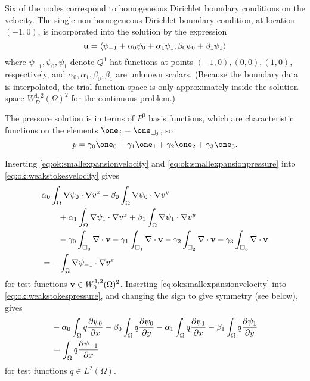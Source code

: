 Six of the nodes correspond to homogeneous Dirichlet boundary conditions on the velocity.  The single non-homogeneous Dirichlet boundary condition, at location $(-1,0)$, is incorporated into the solution by the expression
\begin{equation} 
\mathbf{u} = \left<\psi_{-1}+\alpha_0\psi_0+\alpha_1\psi_1,\beta_0\psi_0+\beta_1\psi_1\right>  \label{eq:ok:smallexpansionvelocity}
\end{equation}
where $\psi_{-1},\psi_0,\psi_1$ denote $Q^1$ hat functions at points $(-1,0),(0,0),(1,0)$, respectively, and $\alpha_0,\alpha_1,\beta_0,\beta_1$ are unknown scalars.  (Because the boundary data is interpolated, the trial function space is only approximately inside the solution space $W_D^{1,2}(\Omega)^2$ for the continuous problem.)

The pressure solution is in terms of $P^0$ basis functions, which are characteristic functions on the elements $\one_j = \one_{\square_j}$, so
\begin{equation}
p = \gamma_0 \one_0 + \gamma_1 \one_1 + \gamma_2 \one_2 + \gamma_3 \one_3.  \label{eq:ok:smallexpansionpressure}
\end{equation}

Inserting \eqref{eq:ok:smallexpansionvelocity} and \eqref{eq:ok:smallexpansionpressure} into \eqref{eq:ok:weakstokesvelocity} gives
\begin{align}
&\alpha_0 \int_\Omega \nabla \psi_0 \cdot \nabla v^x + \beta_0 \int_\Omega \nabla \psi_0 \cdot \nabla v^y \label{eq:ok:smallconcretevelocity} \\
&\qquad + \alpha_1 \int_\Omega \nabla \psi_1 \cdot \nabla v^x + \beta_1 \int_\Omega \nabla \psi_1 \cdot \nabla v^y \notag \\
&\qquad - \gamma_0 \int_{\square_0} \nabla\cdot \mathbf{v} - \gamma_1 \int_{\square_1} \nabla\cdot \mathbf{v} - \gamma_2 \int_{\square_2} \nabla\cdot \mathbf{v} - \gamma_3 \int_{\square_3} \nabla\cdot \mathbf{v} \notag \\
&= - \int_\Omega \nabla \psi_{-1} \cdot \nabla v^x \notag
\end{align}
for test functions $\mathbf{v} \in W_0^{1,2}(\Omega)^2$.  Inserting \eqref{eq:ok:smallexpansionvelocity} into \eqref{eq:ok:weakstokespressure}, and changing the sign to give symmetry (see below), gives
\begin{align}
&- \alpha_0 \int_\Omega q \frac{\partial \psi_0}{\partial x} - \beta_0 \int_\Omega q \frac{\partial \psi_0}{\partial y} - \alpha_1 \int_\Omega q \frac{\partial \psi_1}{\partial x} - \beta_1 \int_\Omega q \frac{\partial \psi_1}{\partial y}  \label{eq:ok:smallconcretepressure} \\
&= \int_\Omega q \frac{\partial \psi_{-1}}{\partial x} \notag
\end{align}
for test functions $q \in L^2(\Omega)$.

